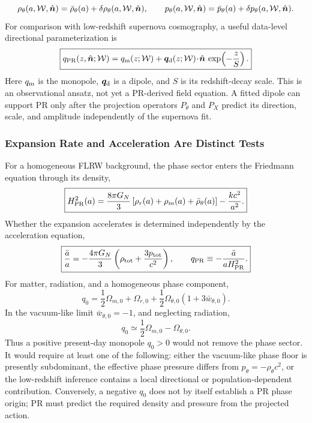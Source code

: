 \documentclass[11pt]{article}
\begin{document}
\begin{equation}
\rho_\theta(a,{\cal W},\hat{\bm n})
=
\bar\rho_\theta(a)
+
\delta\rho_\theta(a,{\cal W},\hat{\bm n}),
\qquad
p_\theta(a,{\cal W},\hat{\bm n})
=
\bar p_\theta(a)
+
\delta p_\theta(a,{\cal W},\hat{\bm n}).
\end{equation}
For comparison with low-redshift supernova cosmography, a useful data-level directional parameterization is
\begin{equation}
\boxed{
q_{\rm PR}(z,\hat{\bm n};{\cal W})
=
q_{\rm m}(z;{\cal W})
+
\bm q_{\rm d}(z;{\cal W})\!\cdot\!\hat{\bm n}\,
\exp\!\left(-\frac{z}{S}\right).
}
\end{equation}
Here \(q_{\rm m}\) is the monopole, \(\bm q_{\rm d}\) is a dipole, and \(S\) is its redshift-decay scale. This is an observational ansatz, not yet a PR-derived field equation. A fitted dipole can support PR only after the projection operators \(P_\theta\) and \(P_X\) predict its direction, scale, and amplitude independently of the supernova fit.

\subsubsection{Expansion Rate and Acceleration Are Distinct Tests}
\label{sec:phase_expansion_acceleration}

For a homogeneous FLRW background, the phase sector enters the Friedmann equation through its density,
\begin{equation}
\boxed{
H_{\rm PR}^2(a)
=
\frac{8\pi G_N}{3}
\left[
\rho_r(a)
+
\rho_m(a)
+
\bar\rho_\theta(a)
\right]
-
\frac{k c^2}{a^2}.
}
\end{equation}
Whether the expansion accelerates is determined independently by the acceleration equation,
\begin{equation}
\boxed{
\frac{\ddot a}{a}
=
-\frac{4\pi G_N}{3}
\left(
\rho_{\rm tot}
+
\frac{3p_{\rm tot}}{c^2}
\right),
\qquad
q_{\rm PR}
\equiv
-\frac{\ddot a}{aH_{\rm PR}^2}.
}
\end{equation}
For matter, radiation, and a homogeneous phase component,
\begin{equation}
q_0
=
\frac{1}{2}\Omega_{m,0}
+
\Omega_{r,0}
+
\frac{1}{2}\Omega_{\theta,0}
\left(1+3\bar w_{\theta,0}\right).
\end{equation}
In the vacuum-like limit \(\bar w_{\theta,0}=-1\), and neglecting radiation,
\begin{equation}
\boxed{
q_0
\simeq
\frac{1}{2}\Omega_{m,0}
-
\Omega_{\theta,0}.
}
\end{equation}
Thus a positive present-day monopole \(q_0>0\) would not remove the phase sector. It would require at least one of the following: either the vacuum-like phase floor is presently subdominant, the effective phase pressure differs from \(p_\theta=-\rho_\theta c^2\), or the low-redshift inference contains a local directional or population-dependent contribution. Conversely, a negative \(q_0\) does not by itself establish a PR phase origin; PR must predict the required density and pressure from the projected action.
\end{document}
